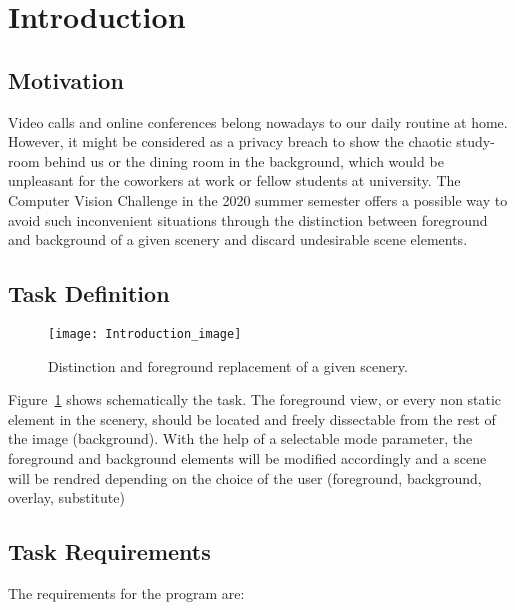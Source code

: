 \section{Introduction}

\subsection{Motivation}

Video calls and online conferences belong nowadays to our daily routine at home. However, it might be considered as a privacy breach to show the chaotic study-room behind us or the dining room in the background, which would be unpleasant for the coworkers at work or fellow students at university. The Computer Vision Challenge in the 2020 summer semester offers a possible way to avoid such inconvenient situations through the distinction between foreground and background of a given scenery and discard undesirable scene elements.
\subsection{Task Definition}

\begin{figure}[!h]
	\centering
	\texttt{[image: Introduction\_image]}
	\caption{Distinction and foreground replacement of a given scenery.}
	\label{fig:Introduction_image}
\end{figure}

Figure~\ref{fig:Introduction_image} shows schematically the task. The foreground view, or every non static element in the scenery, should be located and freely dissectable from the rest of the image (background). With the help of a selectable mode parameter, the foreground and background elements will be modified accordingly and a scene will be rendred depending on the choice of the user (foreground, background, overlay, substitute)
\\

\subsection{Task Requirements}


The requirements for the program are:

